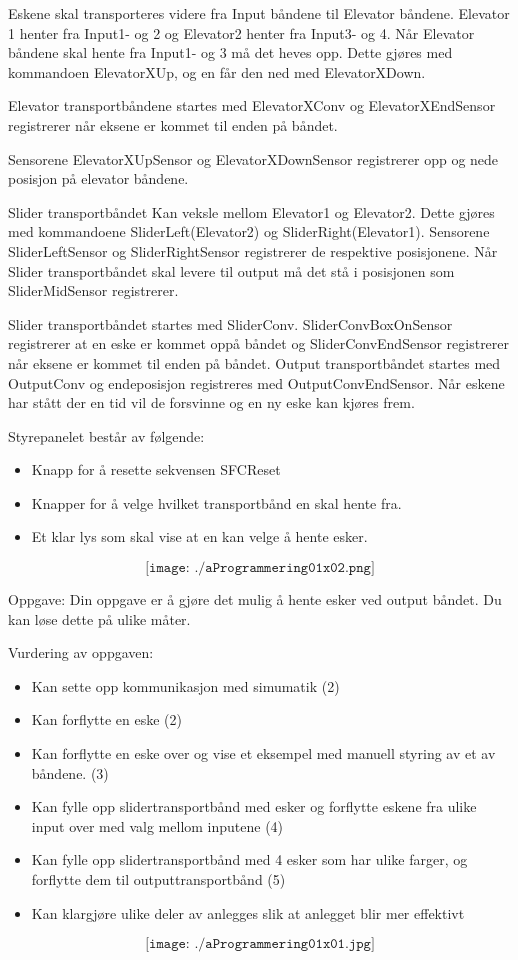 \vskip 5pt 
Eskene skal transporteres videre fra Input båndene til Elevator båndene. Elevator 1 henter fra Input1- og 2 og Elevator2 henter fra Input3- og 4. Når Elevator båndene skal hente fra Input1- og 3 må det heves opp. Dette gjøres med kommandoen ElevatorXUp, og en får den ned med ElevatorXDown. 

\vskip 2.5pt 
Elevator transportbåndene startes med ElevatorXConv og ElevatorXEndSensor registrerer når eksene er kommet til enden på båndet. 

\vskip 5pt 
Sensorene ElevatorXUpSensor og ElevatorXDownSensor registrerer opp og nede posisjon på elevator båndene. 

\vskip 5pt 

Slider transportbåndet Kan veksle mellom Elevator1  og Elevator2. Dette gjøres med kommandoene SliderLeft(Elevator2) og SliderRight(Elevator1). Sensorene SliderLeftSensor og SliderRightSensor registrerer de respektive posisjonene. Når Slider transportbåndet skal levere til output må det stå i posisjonen som SliderMidSensor registrerer.  

\vskip 2.5pt 
Slider transportbåndet startes med SliderConv. SliderConvBoxOnSensor registrerer at en eske er kommet oppå båndet og SliderConvEndSensor registrerer når eksene er kommet til enden på båndet. 
\vskip 5pt 
Output transportbåndet startes med OutputConv og endeposisjon registreres med OutputConvEndSensor. Når eskene har stått der en tid vil de forsvinne og en ny eske kan kjøres frem. 

\vskip 2.5pt 
Styrepanelet består av følgende:
\begin{itemize}[noitemsep]
	\item Knapp for å resette sekvensen SFCReset
	\item Knapper for å velge hvilket transportbånd en skal hente fra. 
	\item Et klar lys som skal vise at en kan velge å hente esker. 
\end{itemize}

$$\texttt{[image: ./aProgrammering01x02.png]}$$
\vskip 2.5pt 
  
\vskip 2.5pt 


Oppgave:
Din oppgave er å gjøre det mulig å hente esker ved output båndet. Du kan løse dette på ulike måter. 

Vurdering av oppgaven:
\begin{itemize}[noitemsep]
	\item Kan sette opp kommunikasjon med simumatik (2)
	\item Kan forflytte en eske (2)
	\item Kan forflytte en eske over og vise et eksempel med manuell styring av et av båndene. (3)
	\item Kan fylle opp slidertransportbånd med esker og forflytte eskene fra ulike input over med valg mellom inputene (4)
	\item Kan fylle opp slidertransportbånd med 4 esker som har ulike farger, og forflytte dem til outputtransportbånd (5)
	\item Kan klargjøre ulike deler av anlegges slik at anlegget blir mer effektivt 
\end{itemize}



\vfil\eject
$$\texttt{[image: ./aProgrammering01x01.jpg]}$$

